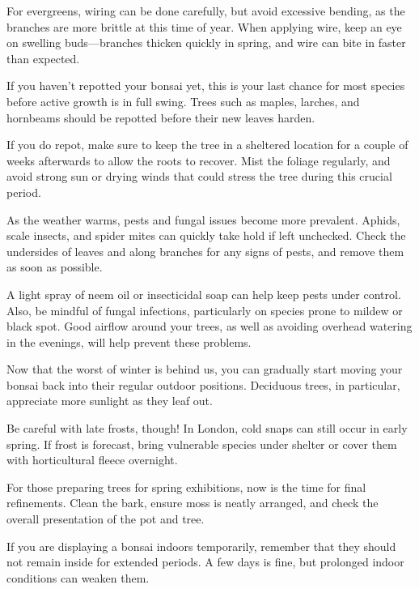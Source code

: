 For evergreens, wiring can be done carefully, but avoid excessive bending, as the branches are more brittle at this time of year.
When applying wire, keep an eye on swelling buds---branches thicken quickly in spring, and wire can bite in faster than expected.

\medskip

\noindent
If you haven't repotted your bonsai yet, this is your last chance for most species before active growth is in full swing.
Trees such as maples, larches, and hornbeams should be repotted before their new leaves harden.

If you do repot, make sure to keep the tree in a sheltered location for a couple of weeks afterwards to allow the roots to recover.
Mist the foliage regularly, and avoid strong sun or drying winds that could stress the tree during this crucial period.

\medskip

\noindent
As the weather warms, pests and fungal issues become more prevalent.
Aphids, scale insects, and spider mites can quickly take hold if left unchecked.
Check the undersides of leaves and along branches for any signs of pests, and remove them as soon as possible.

A light spray of neem oil or insecticidal soap can help keep pests under control.
Also, be mindful of fungal infections, particularly on species prone to mildew or black spot.
Good airflow around your trees, as well as avoiding overhead watering in the evenings, will help prevent these problems.

\medskip

\noindent
Now that the worst of winter is behind us, you can gradually start moving your bonsai back into their regular outdoor positions.
Deciduous trees, in particular, appreciate more sunlight as they leaf out.

Be careful with late frosts, though!
In London, cold snaps can still occur in early spring.
If frost is forecast, bring vulnerable species under shelter or cover them with horticultural fleece overnight.

\medskip

\noindent
For those preparing trees for spring exhibitions, now is the time for final refinements.
Clean the bark, ensure moss is neatly arranged, and check the overall presentation of the pot and tree.

If you are displaying a bonsai indoors temporarily, remember that they should not remain inside for extended periods.
A few days is fine, but prolonged indoor conditions can weaken them.

